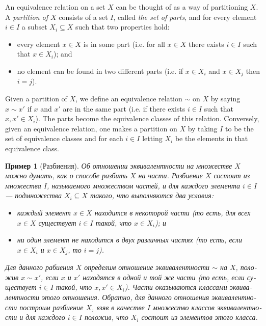 \documentclass[a4paper]{book}
\def\ss{\subseteq}
\theoremstyle{myth}
\newtheorem{exampleENG}[envENG]{\begin{english}Example\end{english}}
\newtheorem{exampleRUS}[envRUS]{Пример}
\begin{document}
\begin{russian}
\begin{exampleENG}[Partitions]\label{ex:partition}
An equivalence relation on a set $X$ can be thought of as a way of partitioning $X$. A {\em partition of $X$} consists of a set $I$, called {\em the set of parts}, and for every element $i\in I$ a subset $X_i\ss X$ such that two properties hold:
\begin{itemize}
\item every element $x\in X$ is in some part (i.e. for all $x\in X$ there exists $i\in I$ such that $x\in X_i$); and
\item no element can be found in two different parts (i.e. if $x\in X_i$ and $x\in X_j$ then $i=j$).
\end{itemize}

Given a partition of $X$, we define an equivalence relation $\sim$ on $X$ by saying $x\sim x'$ if $x$ and $x'$ are in the same part (i.e. if there exists $i\in I$ such that $x,x'\in X_i$). The parts become the equivalence classes of this relation. Conversely, given an equivalence relation, one makes a partition on $X$ by taking $I$ to be the set of equivalence classes and for each $i\in I$ letting $X_i$ be the elements in that equivalence class.
\end{exampleENG}

\begin{exampleRUS}[Разбиения]\label{ex:partition}
Об отношении эквивалентности на множестве $X$ можно думать, как о способе разбить $X$ на части. {\em Разбиение $X$} состоит из множества $I$, называемого {\em множеством частей}, и для каждого элемента $i\in I$ — подмножества $X_i\ss X$ такого, что выполняются два условия:
\begin{itemize}
\item каждый элемент $x\in X$ находится в некоторой части (то есть, для всех $x\in X$ существует $i\in I$ такой, что $x\in X_i$); и
\item ни один элемент не находится в двух различных частях (то есть, если $x\in X_i$ и $x\in X_j$, то $i=j$).
\end{itemize}

Для данного рабиения $X$ определим отношение эквивалентности $\sim$ на $X$, положив $x\sim x'$, если $x$ и $x'$ находятся в одной и той же части (то есть, если существует $i\in I$ такой, что $x,x'\in X_i$). Части оказываются классами эквивалентности этого отношения. Обратно, для данного отношения эквивалентности построим разбиение $X$, взяв в качестве $I$ множество классов эквивалентности и для каждого $i\in I$ положив, что $X_i$ состоит из элементов этого класса.
\end{exampleRUS}


\end{russian}
\end{document}
